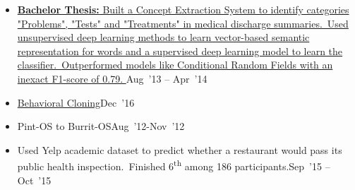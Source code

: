 \documentclass[10pt,a4paper]{article}
\begin{document}
\begin{itemize}[labelindent=1.5em,labelsep=-0.3cm,leftmargin=*]
\item \headedsubsection 
    {\href{}{\normalfont \textbf{Bachelor Thesis:} Built a Concept Extraction System to identify categories "Problems", "Tests" and "Treatments" in medical discharge summaries.~Used unsupervised deep learning methods to learn vector-based semantic representation for words and a supervised deep learning model to learn the classifier.~Outperformed models like Conditional Random Fields with an inexact F1-score of 0.79.
}}{{{Aug~'13 -- Apr~'14}}}
    {}

\item \headedsubsection
{\href{https://github.com/aragun/behavioralcloning}{Behavioral Cloning}}{{{Dec~'16}}}
{}

\item \headedsubsection
{Pint-OS to Burrit-OS}{{{Aug~'12-Nov~'12}}}
{}


\item \headedsubsection  %
  {{\normalfont Used Yelp academic dataset to predict whether a restaurant would pass its public health inspection.~Finished 6\textsuperscript{th} among 186 participants.}}{{{Sep~'15 -- Oct~'15}}}


\end{itemize}
\end{document}

